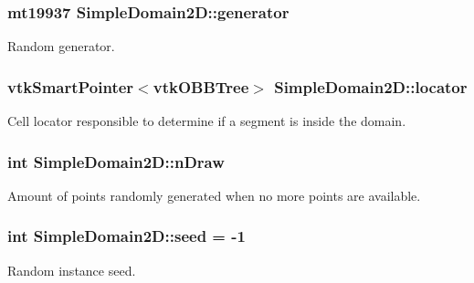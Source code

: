 \subsubsection[{\texorpdfstring{generator}{generator}}]{\setlength{\rightskip}{0pt plus 5cm}mt19937 Simple\+Domain2\+D\+::generator\hspace{0.3cm}{\ttfamily [private]}}\hypertarget{class_simple_domain2_d_a752e854a584a9bc6476903d639d8c0ed}{}\label{class_simple_domain2_d_a752e854a584a9bc6476903d639d8c0ed}
Random generator. 
\subsubsection[{\texorpdfstring{locator}{locator}}]{\setlength{\rightskip}{0pt plus 5cm}vtk\+Smart\+Pointer$<$vtk\+O\+B\+B\+Tree$>$ Simple\+Domain2\+D\+::locator\hspace{0.3cm}{\ttfamily [private]}}\hypertarget{class_simple_domain2_d_a663886e5e4f47a4d1cec260c93b2498b}{}\label{class_simple_domain2_d_a663886e5e4f47a4d1cec260c93b2498b}
Cell locator responsible to determine if a segment is inside the domain. 
\subsubsection[{\texorpdfstring{n\+Draw}{nDraw}}]{\setlength{\rightskip}{0pt plus 5cm}int Simple\+Domain2\+D\+::n\+Draw\hspace{0.3cm}{\ttfamily [private]}}\hypertarget{class_simple_domain2_d_ad541f350ae7423116545f4363f8d0715}{}\label{class_simple_domain2_d_ad541f350ae7423116545f4363f8d0715}
Amount of points randomly generated when no more points are available. 
\subsubsection[{\texorpdfstring{seed}{seed}}]{\setlength{\rightskip}{0pt plus 5cm}int Simple\+Domain2\+D\+::seed = -\/1\hspace{0.3cm}{\ttfamily [private]}}\hypertarget{class_simple_domain2_d_abca10a88602d74c02d5d94651d9fc8bd}{}\label{class_simple_domain2_d_abca10a88602d74c02d5d94651d9fc8bd}
Random instance seed. 
